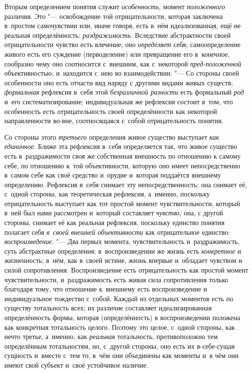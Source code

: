 Вторым определением понятия служит
{\em особенность,} момент
{\em положенного}
различия. Это "--- освобождение той
отрицательности, которая заключена в~простом самочувствии или, иначе
говоря, есть в~нём идеализованная, ещё не реальная определённость:
{\em раздражимость}.
Вследствие абстрактности своей отрицательности чувство есть
влечение; оно {\em определяет}
себя; самоопределение живого есть его суждение (перводеление)
или превращение его в~конечное, сообразно чему оно соотносится с~внешним,
как с~некоторой {\em пред-положенной}
объективностью, и~находится с~нею во взаимодействии. "---
Со стороны своей особенности оно есть отчасти вид наряду с
другими видами живых существ;
{\em формальная}
рефлексия в~себя этой
{\em безразличной разности}
есть формальный {\em род}
и~его систематизирование; индивидуальная же рефлексия состоит
в~том, что особенность есть отрицательность своей определённости как
некоторой направленности во-вне, соотносящаяся с~собой отрицательность
понятия.

Со стороны этого
{\em третьего}
определения живое существо выступает
{\em как единичное}.
Ближе эта рефлексия в~себя определяется так, что живое
существо есть в~раздражимости своя же собственная внешность по отношению к
самому себе, по отношению к~той объективности, которую оно имеет
непосредственно в~самом себе как своё средство и~орудие и~которая поддаётся
внешнему определению. Рефлексия в~себя снимает эту непосредственность; она
снимает её, с~одной стороны, как теоретическая рефлексия, а~именно,
поскольку отрицательность выступает как тот простой момент
чувствительности, который в~ней был нами рассмотрен и~который составляет
{\em чувство;} она, с
другой стороны, снимает её как реальная рефлексия, поскольку единство
понятия полагает себя {\em в~своей
внешней объективности} как отрицательное единство:
{\em воспроизведение}. "---
Два первых момента, чувствительность и~раздражимость, суть
абстрактные определения; в~воспроизведении же жизнь есть
{\em конкретное} и
жизненность; в~нём, как в~своей истине, жизнь впервые и~обладает чувством и
силой сопротивления. Воспроизведение есть отрицательность как простой
момент чувствительности, и~раздражимость есть живая сила сопротивления
только благодаря тому, что отношение к~внешнему есть воспроизведение и
индивидуальное тождество с~собой. Каждый из отдельных
моментов есть по существу тотальность всех; их различие составляет
идеализированная определённость формы, которая (определённость) в
воспроизведении положена как конкретная тотальность целого. Поэтому это
целое, с~одной стороны, как нечто третье, а~именно, как
{\em реальная}
тотальность, противоположно тем определённым тотальностям,
но, с~другой стороны, оно есть их в-себе-сущая сущность и~вместе с~тем то,
в~чём они объединены как моменты и~в чём они имеют свой субъект и~своё
устойчивое наличие.

